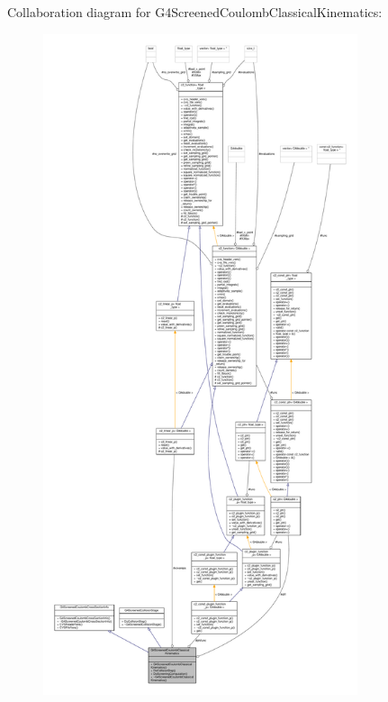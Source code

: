 Collaboration diagram for G4\+Screened\+Coulomb\+Classical\+Kinematics\+:
\nopagebreak
\begin{figure}[H]
\begin{center}
\leavevmode
\includegraphics[height=550pt]{classG4ScreenedCoulombClassicalKinematics__coll__graph}
\end{center}
\end{figure}
